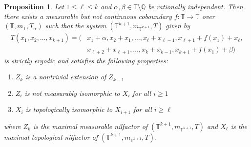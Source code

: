 \documentclass[12pt]{amsart}
\theoremstyle{definition}
\theoremstyle{plain}
\newtheorem{proposition}[theorem]{Proposition}
\theoremstyle{definition}
\numberwithin{equation}{section}
\begin{document}
\begin{proposition} \label{proposition with two coboundaries on k}
    Let $1\leq \ell \leq  k$ and $\alpha,\beta \in \mathbb{T} \setminus \mathbb{Q}$ be rationally independent. Then there exists a measurable but not continuous coboundary $f\colon\mathbb{T} \rightarrow \mathbb{T}$ over $(\mathbb{T},m_{\mathbb{T}},T_{\alpha})$ such that the system $(\mathbb{T}^{k+1},m_{\mathbb{T}^{k+1}},T)$ given by 
  \begin{align*}
      T(x_1,x_2,\dots,x_{k+1})=\Big(&x_1+\alpha,x_2+x_1,\dots,x_{\ell}+x_{\ell-1},x_{\ell+1}+f(x_1)+x_{\ell},\\ &x_{\ell+2}+x_{\ell+1},\dots,x_{k}+x_{k-1},x_{k+1}+f(x_1)+\beta\Big)
  \end{align*}
 is strictly ergodic and satisfies the following properties:

  \begin{enumerate}
   \item $Z_k$ is a nontrivial extension of $Z_{k-1}$
      \item $Z_i$ is not measurably isomorphic to $X_i$ for all $i\geq 1$
      \item $X_i$ is topologically isomorphic to $X_{i+1}$ for all $i \geq \ell$
  \end{enumerate}
where $Z_k$ is the maximal measurable nilfactor of $(\mathbb{T}^{k+1},m_{\mathbb{T}^{k+1}},T)$ and $X_\ell$ is the maximal topological nilfactor of $(\mathbb{T}^{k+1},m_{\mathbb{T}^{k+1}},T)$.
\end{proposition}
\end{document}

